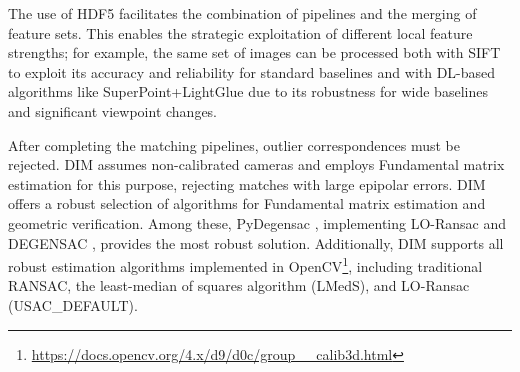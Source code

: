 The use of HDF5 facilitates the combination of pipelines and the merging of feature sets. 
This enables the strategic exploitation of different local feature strengths; for example, the same set of images can be processed both with SIFT to exploit its accuracy and reliability for standard baselines and with DL-based algorithms like SuperPoint+LightGlue due to its robustness for wide baselines and significant viewpoint changes.

After completing the matching pipelines, outlier correspondences must be rejected. 
DIM assumes non-calibrated cameras and employs Fundamental matrix estimation for this purpose, rejecting matches with large epipolar errors. 
DIM offers a robust selection of algorithms for Fundamental matrix estimation and geometric verification. 
Among these, PyDegensac \cite{Mishkin2015_pydegensac}, implementing LO-Ransac \cite{Chum2003_loransac} and DEGENSAC \cite{Chum2005_degensac}, provides the most robust solution.  Additionally, DIM supports all robust estimation algorithms implemented in OpenCV\footnote{\url{https://docs.opencv.org/4.x/d9/d0c/group__calib3d.html}}, including traditional RANSAC, the least-median of squares algorithm (LMedS), and LO-Ransac (USAC\_DEFAULT).




